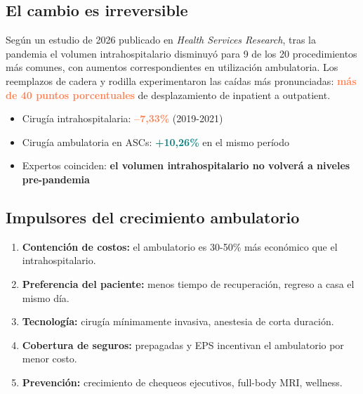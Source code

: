 \documentclass[11pt, a4paper]{article}
\newcommand{\highlight}[1]{\textcolor{teal}{\textbf{#1}}}
\newcommand{\danger}[1]{\textcolor{coral}{\textbf{#1}}}
\newcommand{\fuente}[1]{\par\vspace{2pt}{\scriptsize\textcolor{slate}{Fuente: #1}}}
\begin{document}
\fuente{Market Data Forecast, The Business Research Company, Grand View Research, AHRQ, ExactRx AI}

\subsection{El cambio es irreversible}

Seg\'{u}n un estudio de 2026 publicado en \textit{Health Services Research}, tras la pandemia el volumen intrahospitalario disminuy\'{o} para 9 de los 20 procedimientos m\'{a}s comunes, con aumentos correspondientes en utilizaci\'{o}n ambulatoria. Los reemplazos de cadera y rodilla experimentaron las ca\'{i}das m\'{a}s pronunciadas: \danger{m\'{a}s de 40 puntos porcentuales} de desplazamiento de inpatient a outpatient.

\begin{itemize}
  \item Cirug\'{i}a intrahospitalaria: \danger{--7,33\%} (2019-2021)
  \item Cirug\'{i}a ambulatoria en ASCs: \highlight{+10,26\%} en el mismo per\'{i}odo
  \item Expertos coinciden: \textbf{el volumen intrahospitalario no volver\'{a} a niveles pre-pandemia}
\end{itemize}

\fuente{Chen et al. (2026), Health Services Research; AHRQ Infographics; MedPAC Report to Congress 2025}

\subsection{Impulsores del crecimiento ambulatorio}

\begin{enumerate}
  \item \textbf{Contenci\'{o}n de costos:} el ambulatorio es 30-50\% m\'{a}s econ\'{o}mico que el intrahospitalario.
  \item \textbf{Preferencia del paciente:} menos tiempo de recuperaci\'{o}n, regreso a casa el mismo d\'{i}a.
  \item \textbf{Tecnolog\'{i}a:} cirug\'{i}a m\'{i}nimamente invasiva, anestesia de corta duraci\'{o}n.
  \item \textbf{Cobertura de seguros:} prepagadas y EPS incentivan el ambulatorio por menor costo.
  \item \textbf{Prevenci\'{o}n:} crecimiento de chequeos ejecutivos, full-body MRI, wellness.
\end{enumerate}
\end{document}
